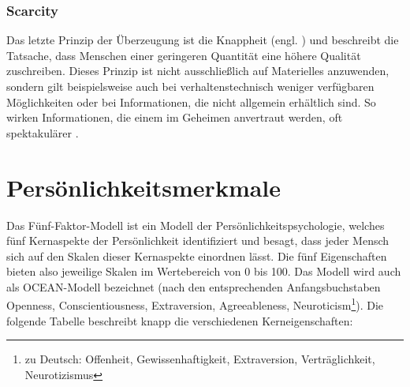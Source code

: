 \subsubsection{Scarcity}
Das letzte Prinzip der Überzeugung ist die Knappheit (engl. ) und beschreibt die Tatsache, dass Menschen einer geringeren Quantität eine höhere Qualität zuschreiben.
Dieses Prinzip ist nicht ausschließlich auf Materielles anzuwenden, sondern gilt beispielsweise auch bei verhaltenstechnisch weniger verfügbaren Möglichkeiten oder bei Informationen, die nicht allgemein erhältlich sind.
So wirken Informationen, die einem im Geheimen anvertraut werden, oft spektakulärer .

\section{Persönlichkeitsmerkmale}

Das Fünf-Faktor-Modell ist ein Modell der Persönlichkeitspsychologie, welches fünf Kernaspekte der Persönlichkeit identifiziert und besagt, dass jeder Mensch sich auf den Skalen dieser Kernaspekte einordnen lässt.
Die fünf Eigenschaften bieten also jeweilige Skalen im Wertebereich von 0 bis 100.
Das Modell wird auch als OCEAN-Modell bezeichnet (nach den entsprechenden Anfangsbuchstaben Openness, Conscientiousness, Extraversion, Agreeableness, Neuroticism\footnote{zu Deutsch: Offenheit, Gewissenhaftigkeit, Extraversion, Verträglichkeit, Neurotizismus}).
Die folgende Tabelle beschreibt knapp die verschiedenen Kerneigenschaften:


